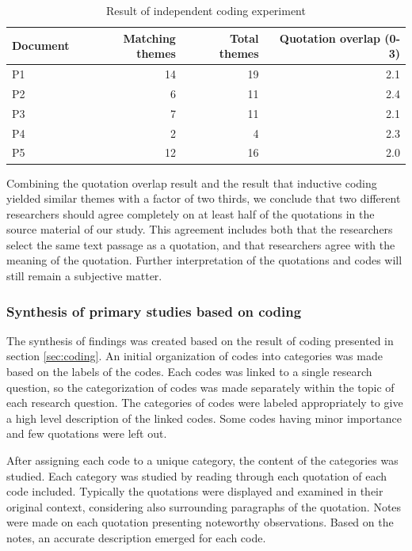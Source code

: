 \documentclass[preprint,authoryear,12pt]{elsarticle}
\begin{document}
\begin{table}
    \centering
    \begin{tabular}{ l r r r }
        \toprule
        Document    &  Matching themes  &  Total themes  &  Quotation overlap (0-3) \\
        \midrule
        P1          &  14  &  19   &  2.1  \\
        P2          &   6  &  11   &  2.4  \\
        P3          &   7  &  11   &  2.1  \\
        P4          &   2  &   4   &  2.3  \\
        P5          &  12  &  16   &  2.0  \\
        \bottomrule
    \end{tabular}
    \caption{Result of independent coding experiment}
    \label{table:codingexperiment}
\end{table}

Combining the quotation overlap result and the result that inductive coding
yielded similar themes with a factor of two thirds, we conclude that two
different researchers should agree completely on at least half of the quotations
in the source material of our study. This agreement includes both that the
researchers select the same text passage as a quotation, and that researchers
agree with the meaning of the quotation. Further interpretation of the
quotations and codes will still remain a subjective matter.


\subsubsection{Synthesis of primary studies based on coding}

The synthesis of findings was created based on the result of coding presented in
section \ref{sec:coding}. An initial organization of codes into categories was
made based on the labels of the codes. Each codes was linked to a single
research question, so the categorization of codes was made separately within
the topic of each research question. The categories of codes were labeled
appropriately to give a high level description of the linked codes. Some codes
having minor importance and few quotations were left out.

After assigning each code to a unique category, the content of the categories
was studied. Each category was studied by reading through each quotation of each
code included. Typically the quotations were displayed and examined in their
original context, considering also surrounding paragraphs of the quotation.
Notes were made on each quotation presenting noteworthy observations. Based on
the notes, an accurate description emerged for each code.
\end{document}
